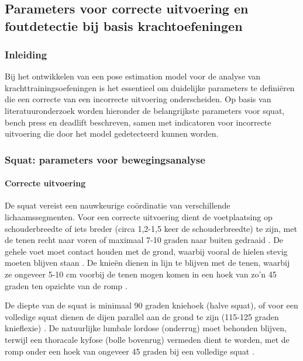 \chapter{}%
\label{ch:selectie}

\section{Parameters voor correcte uitvoering en foutdetectie bij basis krachtoefeningen}

\subsection{Inleiding}
Bij het ontwikkelen van een pose estimation model voor de analyse van krachttrainingsoefeningen is het essentieel om duidelijke parameters te definiëren die een correcte van een incorrecte uitvoering onderscheiden. 
Op basis van literatuuronderzoek worden hieronder de belangrijkste parameters voor squat, bench press en deadlift beschreven, samen met indicatoren voor incorrecte uitvoering die door het model gedetecteerd kunnen worden.

\subsection{Squat: parameters voor bewegingsanalyse}

\subsubsection{Correcte uitvoering}
De squat vereist een nauwkeurige coördinatie van verschillende lichaamssegmenten. 
Voor een correcte uitvoering dient de voetplaatsing op schouderbreedte of iets breder (circa 1,2-1,5 keer de schouderbreedte) te zijn, met de tenen recht naar voren of maximaal 7-10 graden naar buiten gedraaid \autocite{Lorenzetti2018}. 
De gehele voet moet contact houden met de grond, waarbij vooral de hielen stevig moeten blijven staan \autocite{Czaprowski2012}. 
De knieën dienen in lijn te blijven met de tenen, waarbij ze ongeveer 5-10 cm voorbij de tenen mogen komen in een hoek van zo'n 45 graden ten opzichte van de romp \autocite{Lorenzetti2018}.

De diepte van de squat is minimaal 90 graden kniehoek (halve squat), of voor een volledige squat dienen de dijen parallel aan de grond te zijn (115-125 graden knieflexie) \autocite{Comfort2018}. 
De natuurlijke lumbale lordose (onderrug) moet behouden blijven, terwijl een thoracale kyfose (bolle bovenrug) vermeden dient te worden, met de romp onder een hoek van ongeveer 45 graden bij een volledige squat \autocite{Czaprowski2012}.

